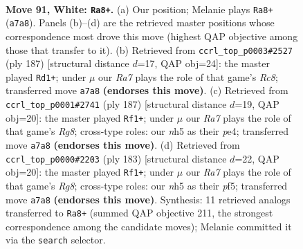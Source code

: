 \documentclass[11pt]{article}
\begin{document}
\clearpage

\begin{figure}[p]\centering
\begin{subfigure}{0.46\textwidth}\centering
\resizebox{\linewidth}{!}{%
\newchessgame
\chessboard[
  setfen={7k/R7/8/7n/p6r/P7/7p/7K w - - 8 91},
  showmover=false,
  pgfstyle=straightmove, color=movearrow, markmove={a7-a8}
]}
\caption{}
\end{subfigure}\hfill
\begin{subfigure}{0.46\textwidth}\centering
\resizebox{\linewidth}{!}{%
\newchessgame
\chessboard[
  setfen={8/k7/P7/R1P5/3K4/8/8/2r5 b - - 28 94},
  showmover=false,
  pgfstyle=straightmove, color=movearrow, markmove={c1-d1}
]}
\caption{}
\end{subfigure}
\\[4pt]
\begin{subfigure}{0.46\textwidth}\centering
\resizebox{\linewidth}{!}{%
\newchessgame
\chessboard[
  setfen={8/6k1/4R1P1/8/4PK2/8/8/6r1 b - - 64 94},
  showmover=false,
  pgfstyle=straightmove, color=movearrow, markmove={g1-f1}
]}
\caption{}
\end{subfigure}\hfill
\begin{subfigure}{0.46\textwidth}\centering
\resizebox{\linewidth}{!}{%
\newchessgame
\chessboard[
  setfen={8/7k/7P/5P2/8/5K1R/8/6r1 b - - 0 92},
  showmover=false,
  pgfstyle=straightmove, color=movearrow, markmove={g1-f1}
]}
\caption{}
\end{subfigure}
\caption{\textbf{Move 91, White: \texttt{Ra8+}.} (a) Our position; Melanie plays \texttt{Ra8+} (\texttt{a7a8}). Panels (b)--(d) are the retrieved master positions whose correspondence most drove this move (highest QAP objective among those that transfer to it). (b) Retrieved from \texttt{ccrl\_top\_p0003\#2527} (ply 187) [structural distance $d$=17, QAP obj=24]: the master played \texttt{Rd1+}; under $\mu$ our \emph{Ra7} plays the role of that game's \emph{Rc8}; transferred move \texttt{a7a8} \textbf{(endorses this move)}. (c) Retrieved from \texttt{ccrl\_top\_p0001\#2741} (ply 187) [structural distance $d$=19, QAP obj=20]: the master played \texttt{Rf1+}; under $\mu$ our \emph{Ra7} plays the role of that game's \emph{Rg8}; cross-type roles: our \emph{n}h5 as their \emph{p}e4; transferred move \texttt{a7a8} \textbf{(endorses this move)}. (d) Retrieved from \texttt{ccrl\_top\_p0000\#2203} (ply 183) [structural distance $d$=22, QAP obj=20]: the master played \texttt{Rf1+}; under $\mu$ our \emph{Ra7} plays the role of that game's \emph{Rg8}; cross-type roles: our \emph{n}h5 as their \emph{p}f5; transferred move \texttt{a7a8} \textbf{(endorses this move)}. Synthesis: 11 retrieved analogs transferred to \texttt{Ra8+} (summed QAP objective 211, the strongest correspondence among the candidate moves); Melanie committed it via the \texttt{search} selector.}
\label{fig:thought-m180}
\end{figure}
\end{document}
